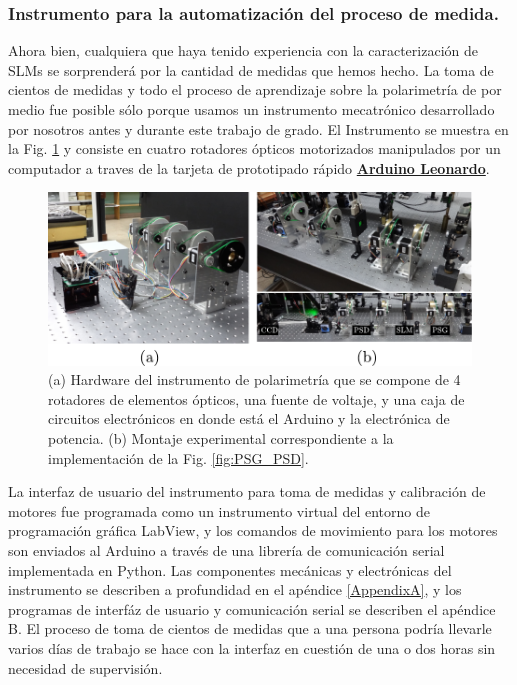 \subsubsection{Instrumento para la automatización del proceso de medida.}
Ahora bien, cualquiera que haya tenido experiencia con la
caracterización de SLMs se sorprenderá por la cantidad de medidas que
hemos hecho. La toma de cientos de medidas y todo el proceso de
aprendizaje sobre la polarimetría de por medio fue posible sólo
porque usamos un instrumento mecatrónico desarrollado por nosotros
antes y durante este trabajo de grado. El Instrumento se muestra en la
Fig. \ref{fig:montaje_real_polarimetro} y consiste en
cuatro rotadores ópticos motorizados manipulados por un computador a
traves de la tarjeta de prototipado rápido
\href{http://www.arduino.cc/en/Main/ArduinoBoardLeonardo}{\bf{Arduino Leonardo}}. 
\begin{figure}[h!]
\centering
\includegraphics[scale=.96]{montaje_real_polarimetro.pdf}
\caption[Hardware del instrumento de polarimetría y montaje
experimental ]{(a) Hardware del instrumento de polarimetría que se
  compone de 4 rotadores de elementos ópticos, una fuente de voltaje,
  y una caja de circuitos electrónicos en donde está el Arduino y la
  electrónica de potencia. (b) Montaje experimental correspondiente a
  la implementación de la Fig. \ref{fig:PSG_PSD}. }
\label{fig:montaje_real_polarimetro}
\end{figure}
 La interfaz de usuario del instrumento para toma de medidas y
calibración de motores fue programada como un
instrumento virtual del entorno de programación gráfica LabView, y los
comandos de movimiento para los motores son enviados al Arduino a
través de una librería de comunicación serial implementada en Python.
Las componentes mecánicas y electrónicas del instrumento se describen a profundidad en el
apéndice \ref{AppendixA}, y los programas de interfáz de usuario y
comunicación serial se describen el apéndice B.
El proceso de toma de cientos de medidas que a una persona podría llevarle varios
días de trabajo se hace con la interfaz en cuestión de una o dos horas
sin necesidad de supervisión.    

